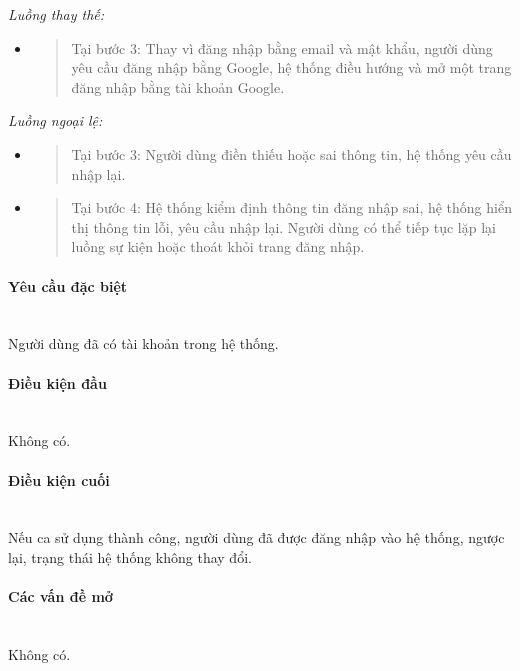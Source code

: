 \documentclass[./../main.tex]{subfiles}
\begin{document}
\emph{Luồng thay thế:}

\begin{itemize}
	\item
	      \begin{quote}
	      	Tại bước 3: Thay vì đăng nhập bằng email và mật khẩu, người dùng yêu
	      	cầu đăng nhập bằng Google, hệ thống điều hướng và mở một trang đăng
	      	nhập bằng tài khoản Google.
	      \end{quote}
\end{itemize}

\emph{Luồng ngoại lệ:}

\begin{itemize}
	\item
	      \begin{quote}
	      	Tại bước 3: Người dùng điền thiếu hoặc sai thông tin, hệ thống yêu cầu
	      	nhập lại.
	      \end{quote}
	\item
	      \begin{quote}
	      	Tại bước 4: Hệ thống kiểm định thông tin đăng nhập sai, hệ thống hiển
	      	thị thông tin lỗi, yêu cầu nhập lại. Người dùng có thể tiếp tục lặp
	      	lại luồng sự kiện hoặc thoát khỏi trang đăng nhập.
	      \end{quote}
\end{itemize}

\paragraph*{Yêu cầu đặc biệt} ~\\

Người dùng đã có tài khoản trong hệ thống.

\paragraph*{Điều kiện đầu} ~\\

Không có.

\paragraph*{Điều kiện cuối} ~\\

Nếu ca sử dụng thành công, người dùng đã được đăng nhập vào hệ thống,
ngược lại, trạng thái hệ thống không thay đổi.

\paragraph*{Các vấn đề mở} ~\\

Không có.
\end{document}
